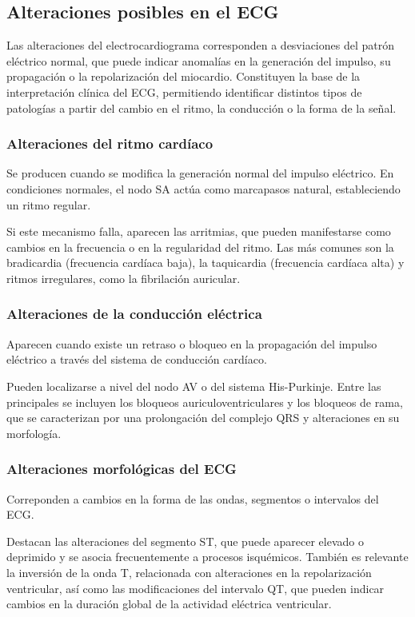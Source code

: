 \documentclass[12pt,a4paper,twoside]{book}
\begin{document}
\subsection{Alteraciones posibles en el ECG}

Las alteraciones del electrocardiograma corresponden a desviaciones del patrón eléctrico normal, que puede indicar anomalías en la generación del impulso, su propagación o la repolarización del miocardio.
Constituyen la base de la interpretación clínica del ECG, permitiendo identificar distintos tipos de patologías a partir del cambio en el ritmo, la conducción o la forma de la señal.

\subsubsection*{Alteraciones del ritmo cardíaco}

Se producen cuando se modifica la generación normal del impulso eléctrico. 
En condiciones normales, el nodo SA actúa como marcapasos natural, estableciendo un ritmo regular.

Si este mecanismo falla, aparecen las arritmias, que pueden manifestarse como cambios en la frecuencia o en la regularidad del ritmo. 
Las más comunes son la bradicardia (frecuencia cardíaca baja), la taquicardia (frecuencia cardíaca alta) y ritmos irregulares, como la fibrilación auricular.

\subsubsection*{Alteraciones de la conducción eléctrica}

Aparecen cuando existe un retraso o bloqueo en la propagación del impulso eléctrico a través del sistema de conducción cardíaco.

Pueden localizarse a nivel del nodo AV o del sistema His-Purkinje. Entre las principales se incluyen los bloqueos auriculoventriculares y los bloqueos de rama, que se caracterizan por una prolongación del complejo QRS y alteraciones en su morfología.

\subsubsection*{Alteraciones morfológicas del ECG}

Correponden a cambios en la forma de las ondas, segmentos o intervalos del ECG. 

Destacan las alteraciones del segmento ST, que puede aparecer elevado o deprimido y se asocia frecuentemente a procesos isquémicos. También es relevante la inversión de la onda T, relacionada con alteraciones en la repolarización ventricular, así como las modificaciones del intervalo QT, que pueden indicar cambios en la duración global de la actividad eléctrica ventricular.
\end{document}
